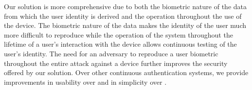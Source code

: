 Our solution is more comprehensive due to
both 
the biometric nature of the data 
from which the user identity is derived
and
the operation throughout the use of the device.
%
The biometric nature of the data makes the
identity of the user much more difficult to reproduce while
%
the operation of the system throughout the lifetime of 
a user's interaction with the device allows
continuous testing of the user's identity.
%
The need for an adversary
to reproduce a user biometric throughout the entire attack
against a device further improves the security offered by our solution.
%
Over other continuous authentication systems,
we provide improvements 
in usability over \cite{feng2012continuous}
and in simplicity over \cite{frank2013touchalytics}.
